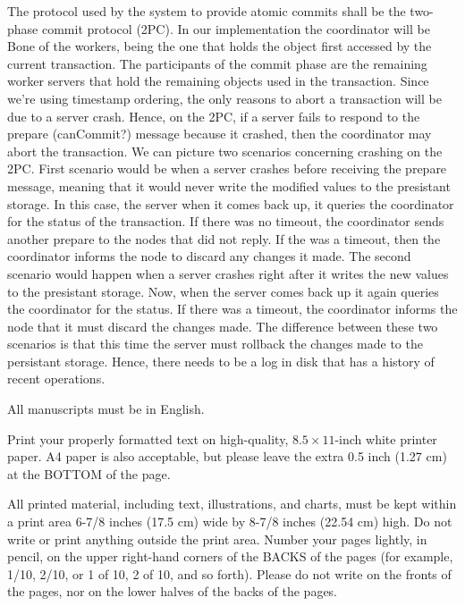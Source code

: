 \documentclass[times, 10pt,twocolumn]{article}
\begin{document}
The protocol used by the system to provide atomic commits shall be the two-phase commit protocol (2PC). In our implementation the coordinator will be Bone of the workers, being the one that holds the object first accessed by the current transaction. The participants of the commit phase are the remaining worker servers that hold the remaining objects used in the transaction. Since we're using timestamp ordering, the only reasons to abort a transaction will be due to a server crash. Hence, on the 2PC, if a server fails to respond to the prepare (canCommit?) message because it crashed, then the coordinator may abort the transaction.
We can picture two scenarios concerning crashing on the 2PC.
First scenario would be when a server crashes before receiving the prepare message, meaning that it would never write the modified values to the presistant storage. In this case, the server when it comes back up, it queries the coordinator for the status of the transaction. If there was no timeout, the coordinator sends another prepare to the nodes that did not reply. If the was a timeout, then the coordinator informs the node to discard any changes it made.
The second scenario would happen when a server crashes right after it writes the new values to the presistant storage. Now, when the server comes back up it again queries the coordinator for the status. If there was a timeout, the coordinator informs the node that it must discard the changes made. The difference between these two scenarios is that this time the server must rollback the changes made to the persistant storage. Hence, there needs to be a log in disk that has a history of recent operations.


All manuscripts must be in English.


Print your properly formatted text on high-quality, $8.5 \times 11$-inch 
white printer paper. A4 paper is also acceptable, but please leave the 
extra 0.5 inch (1.27 cm) at the BOTTOM of the page.


All printed material, including text, illustrations, and charts, must be 
kept within a print area 6-7/8 inches (17.5 cm) wide by 8-7/8 inches 
(22.54 cm) high. Do not write or print anything outside the print area. 
Number your pages lightly, in pencil, on the upper right-hand corners of 
the BACKS of the pages (for example, 1/10, 2/10, or 1 of 10, 2 of 10, and 
so forth). Please do not write on the fronts of the pages, nor on the 
lower halves of the backs of the pages.
\end{document}
